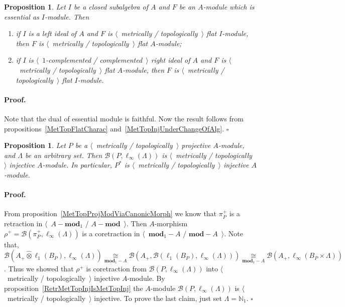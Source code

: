 \documentclass[12pt]{article}
\newcommand{\projtens}{\mathbin{\widehat{\otimes}}}
\newcommand{\isom}[1]{\mathop{\mathbin{\cong}}\limits_{#1}}
\newtheorem{proposition}[theorem]{Proposition}
\renewenvironment{proof}{\paragraph{Proof.}}{\hfill$\square$\medskip}
\begin{document}
\begin{proposition}\label{MetTopFlatUnderChangeOfAlg} Let $I$ be a closed
    subalgebra of $A$ and $F$ be an $A$-module which is essential as $I$-module.
    Then
    \begin{enumerate}[label = (\roman*)]
        \item if $I$ is a left ideal of $A$ and $F$ is $\langle$~metrically /
              topologically~$\rangle$  flat $I$-module, then $F$ is
              $\langle$~metrically / topologically~$\rangle$ flat $A$-module;

        \item if $I$ is $\langle$~$1$-complemented / complemented~$\rangle$
              right ideal of $A$ and $F$ is $\langle$~metrically /
              topologically~$\rangle$ flat $A$-module, then $F$ is
              $\langle$~metrically / topologically~$\rangle$ flat $I$-module.
    \end{enumerate}
\end{proposition}
\begin{proof} Note that the dual of essential module is faithful. Now the result
    follows from propositions~\ref{MetTopFlatCharac}
    and~\ref{MetTopInjUnderChangeOfAlg}.
\end{proof}

\begin{proposition}\label{DualMetTopProjIsMetrInj} Let $P$ be a
    $\langle$~metrically / topologically~$\rangle$ projective $A$-module, and
    $\Lambda$ be an arbitrary set. Then $\mathcal{B}(P,\ell_\infty(\Lambda))$ is
    $\langle$~metrically / topologically~$\rangle$ injective $A$-module. In
    particular, $P^*$ is $\langle$~metrically / topologically~$\rangle$
    injective $A$-module.
\end{proposition}
\begin{proof} From proposition~\ref{MetTopProjModViaCanonicMorph} we know that
    $\pi_P^+$ is a retraction in $\langle$~$A-\mathbf{mod}_1$ / $A-\mathbf{mod}$~$\rangle$. Then
    $A$-morphism $\rho^+=\mathcal{B}(\pi_P^+,\ell_\infty(\Lambda))$ is a
    coretraction in $\langle$~$\mathbf{mod}_1-A$ / $\mathbf{mod}-A$~$\rangle$. Note that,
    $\mathcal{B}(A_+\projtens\ell_1(B_P),\ell_\infty(\Lambda))
        \isom{\mathbf{mod}_1-A}
        \mathcal{B}(A_+,\mathcal{B}(\ell_1(B_P),\ell_\infty(\Lambda)))
        \isom{\mathbf{mod}_1-A}
        \mathcal{B}(A_+,\ell_\infty(B_P\times\Lambda))$. Thus we showed that
    $\rho^+$ is coretraction from $\mathcal{B}(P,\ell_\infty(\Lambda))$ into
    $\langle$~metrically / topologically~$\rangle$ injective $A$-module. By
    proposition~\ref{RetrMetTopInjIsMetTopInj} the $A$-module
    $\mathcal{B}(P,\ell_\infty(\Lambda))$ is $\langle$~metrically /
    topologically~$\rangle$ injective. To prove the last claim, just set
    $\Lambda=\mathbb{N}_1$.
\end{proof}
\end{document}

